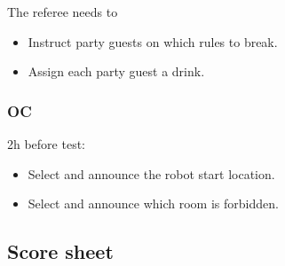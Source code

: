 The referee needs to
\begin{itemize}
	\item Instruct party guests on which rules to break.
	\item Assign each party guest a drink.
\end{itemize}

\subsubsection*{OC}
2h before test:
\begin{itemize}
	\item Select and announce the robot start location.
	\item Select and announce which room is forbidden.
\end{itemize}

\subsection*{Score sheet}



